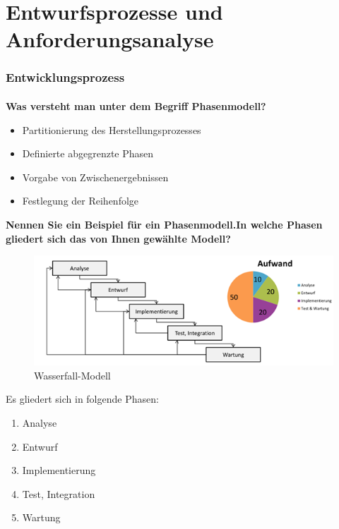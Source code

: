 \part{Entwurfsprozesse und Anforderungsanalyse}
\section{Entwicklungsprozess}
\subsection{}
\textbf{Was versteht man unter dem Begriff Phasenmodell?}
\begin{itemize}
    \item Partitionierung des Herstellungsprozesses
    \item Definierte abgegrenzte Phasen
    \item Vorgabe von Zwischenergebnissen
    \item Festlegung der Reihenfolge
\end{itemize}

\textbf{Nennen Sie ein Beispiel für ein Phasenmodell.In welche Phasen gliedert sich das von Ihnen gewählte
    Modell?}
\begin{figure}[H]
    \centering
    \includegraphics[width=.6\linewidth]{Graphics/Wasserfall-Modell.png}
    \caption{Wasserfall-Modell}
\end{figure}
Es gliedert sich in folgende Phasen:
\begin{enumerate}
    \item Analyse
    \item Entwurf
    \item Implementierung
    \item Test, Integration
    \item Wartung
\end{enumerate}

